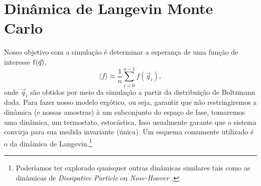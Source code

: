 \section{Dinâmica de Langevin Monte Carlo}

Nosso objetivo com a simulação é determinar a esperança de uma função de interesse $\operatorname{f}(\vec{q})$, $$\langle f \rangle \approx \frac{1}{n} \sum_{i=0}^{n-1} f(\vec{q}_i),$$ onde $\vec{q}_i$ são obtidos por meio da simulação a partir da distribuição de Boltzmann dada. Para fazer nosso modelo ergótico, ou seja, garantir que não restringiremos a dinâmica (e nossas amostras) à um subconjunto do espaço de fase, tomaremos uma dinâmica, um termostato, estocástica. Isso usualmente garante que o sistema convirja para sua medida invariante (única). Um esquema comumente utilizado é o da dinâmica de Langevin.\footnote{Poderíamos ter explorado quaisquer outras dinâmicas similares tais como as dinâmicas de \textit{Dissipative Particle} \cite{DPD} ou \textit{Nose-Hoover} \cite{Hoover}.} 

